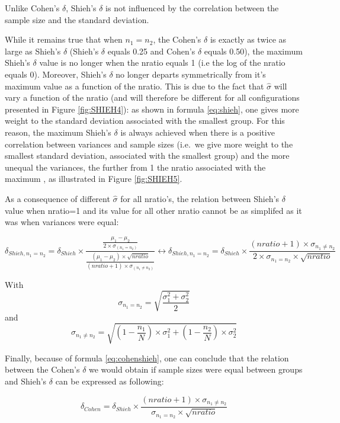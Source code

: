 \documentclass[man]{apa6}
\begin{document}
Unlike Cohen's \(\delta\), Shieh's \(\delta\) is not influenced by the correlation between the sample size and the standard deviation.

While it remains true that when \(n_{1}=n_{2}\), the Cohen's \(\delta\) is exactly as twice as large as Shieh's \(\delta\) (Shieh's \(\delta\) equals 0.25 and Cohen's \(\delta\) equals 0.50), the maximum Shieh's \(\delta\) value is no longer when the nratio equals 1 (i.e the log of the nratio equals 0). Moreover, Shieh's \(\delta\) no longer departs symmetrically from it's maximum value as a function of the nratio. This is due to the fact that \(\hat{\sigma}\) will vary a function of the nratio (and will therefore be different for all configurations presented in Figure \ref{fig:SHIEH4}): as shown in formula \ref{eq:shieh}, one gives more weight to the standard deviation associated with the smallest group. For this reason, the maximum Shieh's \(\delta\) is always achieved when there is a positive correlation between variances and sample sizes (i.e.~we give more weight to the smallest standard deviation, associated with the smallest group) and the more unequal the variances, the further from 1 the nratio associated with the maximum , as illustrated in Figure \ref{fig:SHIEH5}.

As a consequence of different \(\hat{\sigma}\) for all nratio's, the relation between Shieh's \(\delta\) value when nratio=1 and its value for all other nratio cannot be as simplifed as it was when variances were equal:

\begin{equation} 
\delta_{Shieh,n_1=n_2}= \delta_{Shieh} \times \frac{\frac{\mu_1-\mu_2}{2 \times \sigma_{(n_1=n_2)}}}{\frac{(\mu_1-\mu_2) \times \sqrt{nratio}}{(nratio+1) \times \sigma_{(n_1\neq n_2)}}}
\leftrightarrow \delta_{Shieh,n_1=n_2}= \delta_{Shieh} \times \frac{(nratio+1) \times \sigma_{n_1 \neq n_2}}{2 \times \sigma_{n_1=n_2} \times \sqrt{nratio}}
\label{eq:shiehvsbaldesign}
\end{equation}

With \[\sigma_{n_1=n_2}= \sqrt{\frac{\sigma_1^2+\sigma_2^2}{2}}\] and
\[\sigma_{n_1 \neq n_2} = \sqrt{(1- \frac{n_1}{N}) \times \sigma_1^2+(1- \frac{n_2}{N}) \times \sigma_2^2}\]

Finally, because of formula \ref{eq:cohenshieh}, one can conclude that the relation between the Cohen's \(\delta\) we would obtain if sample sizes were equal between groups and Shieh's \(\delta\) can be expressed as following:

\begin{equation} 
\delta_{Cohen}= \delta_{Shieh} \times \frac{(nratio+1) \times \sigma_{n_1 \neq n_2}}{\sigma_{n_1=n_2} \times \sqrt{nratio}}
\label{eq:shiehvsbaldesign2}
\end{equation}
\end{document}
